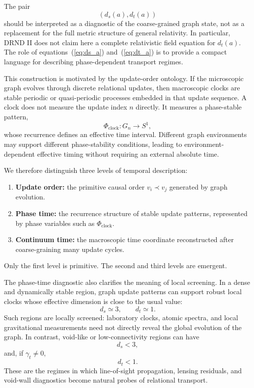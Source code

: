 \documentclass[12pt]{iopart}
\begin{document}
The pair
\begin{equation}
\left(d_s(a),d_t(a)\right)
\end{equation}
should be interpreted as a diagnostic of the coarse-grained graph state, not as a replacement for the full metric structure of general relativity. In particular, DRND II does not claim here a complete relativistic field equation for \(d_t(a)\). The role of equations~(\ref{eq:ds_a}) and~(\ref{eq:dt_a}) is to provide a compact language for describing phase-dependent transport regimes.

This construction is motivated by the update-order ontology. If the microscopic graph evolves through discrete relational updates, then macroscopic clocks are stable periodic or quasi-periodic processes embedded in that update sequence. A clock does not measure the update index \(n\) directly. It measures a phase-stable pattern,
\begin{equation}
\Phi_{\mathrm{clock}}:G_n\rightarrow S^1,
\end{equation}
whose recurrence defines an effective time interval. Different graph environments may support different phase-stability conditions, leading to environment-dependent effective timing without requiring an external absolute time.

We therefore distinguish three levels of temporal description:
\begin{enumerate}
    \item \textbf{Update order:} the primitive causal order \(v_i\prec v_j\) generated by graph evolution.
    \item \textbf{Phase time:} the recurrence structure of stable update patterns, represented by phase variables such as \(\Phi_{\mathrm{clock}}\).
    \item \textbf{Continuum time:} the macroscopic time coordinate reconstructed after coarse-graining many update cycles.
\end{enumerate}
Only the first level is primitive. The second and third levels are emergent.

The phase-time diagnostic also clarifies the meaning of local screening. In a dense and dynamically stable region, graph update patterns can support robust local clocks whose effective dimension is close to the usual value:
\begin{equation}
d_s\simeq 3,\qquad d_t\simeq 1.
\end{equation}
Such regions are locally screened: laboratory clocks, atomic spectra, and local gravitational measurements need not directly reveal the global evolution of the graph. In contrast, void-like or low-connectivity regions can have
\begin{equation}
d_s<3,
\end{equation}
and, if \(\gamma_t\neq 0\),
\begin{equation}
d_t<1.
\end{equation}
These are the regimes in which line-of-sight propagation, lensing residuals, and void-wall diagnostics become natural probes of relational transport.
\end{document}
